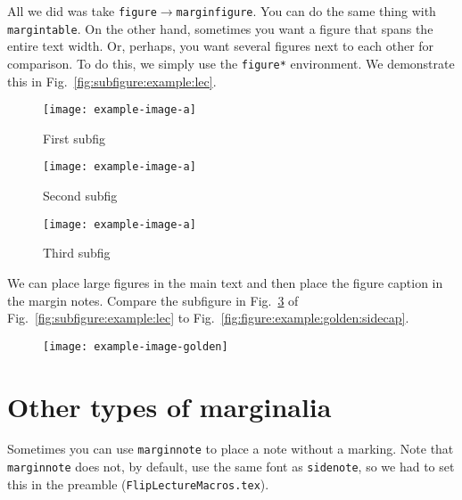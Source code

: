All we did was take \texttt{figure}$\rightarrow$\texttt{marginfigure}. You can do the same thing with \texttt{margintable}. On the other hand, sometimes you want a figure that spans the entire text width. Or, perhaps, you want several figures next to each other for comparison. To do this, we simply use the \texttt{figure*} environment. We demonstrate this in Fig.~\ref{fig:subfigure:example:lec}.
\begin{figure*}%
    \centering
    \begin{subfigure}{0.3\linewidth}
    \centering
        \texttt{[image: example-image-a]}
        \caption{First subfig}
        \label{fig:subfig:1:lec}
    \end{subfigure}\;%
    \begin{subfigure}{0.3\linewidth}
    \centering
        \texttt{[image: example-image-a]}
        \caption{Second subfig}
        \label{fig:subfig:2:lec}
    \end{subfigure}\;%
    \begin{subfigure}{0.3\linewidth}
    \centering
        \texttt{[image: example-image-a]}
        \caption{Third subfig}
        \label{fig:subfig:3:lec}
    \end{subfigure}%
    \caption{Here's how to spread a figure across the entire page, not just the main text width.}
    \label{fig:subfigure:example:lec}
\end{figure*}


We can place large figures in the main text and then place the figure caption in the margin notes. Compare the subfigure in Fig.~\ref{fig:subfig:3:lec} of Fig.~\ref{fig:subfigure:example:lec} to Fig.~\ref{fig:figure:example:golden:sidecap}.
\begin{figure}%
    \texttt{[image: example-image-golden]}
\end{figure}

\section{Other types of marginalia}

Sometimes you can use \texttt{marginnote} to place a note without a marking. Note that \texttt{marginnote} does not, by default, use the same font as \texttt{sidenote}, so we had to set this in the preamble (\texttt{FlipLectureMacros.tex}).


